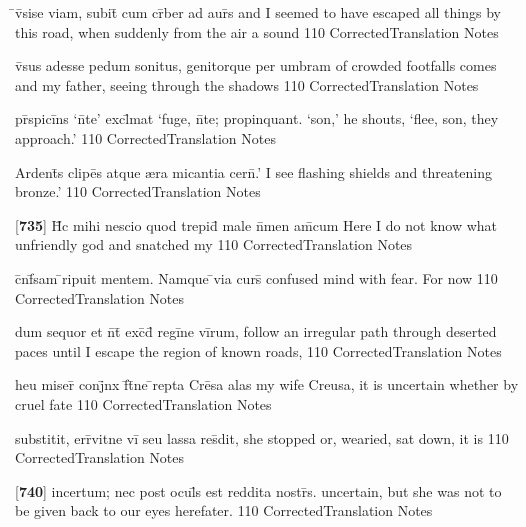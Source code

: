 \latline
  {\={}v\={}sise viam, subit\={} cum cr\={}ber ad aur\={\macron {\i}}s}
  { and I seemed to have escaped all things by this road, when suddenly from the air a sound }
  {110}
  { CorrectedTranslation }
  { Notes }


\latline
  {v\={\macron {\i}}sus adesse pedum sonitus, genitorque per umbram}
  { of crowded footfalls comes and my father, seeing through the shadows  }
  {110}
  { CorrectedTranslation }
  { Notes }


\latline
  {pr\={}spici\={}ns `n\={}te' excl\={}mat `fuge, n\={}te; propinquant.}
  { `son,' he shouts, `flee, son, they approach.' }
  {110}
  { CorrectedTranslation }
  { Notes }


\latline
  {Ardent\={\macron {\i}}s clipe\={}s atque {\ae}ra micantia cern\={}.'}
  { I see flashing shields and threatening bronze.' }
  {110}
  { CorrectedTranslation }
  { Notes }


\latline
  {[\textbf{735}] H\={\macron {\i}}c mihi nescio quod trepid\={} male n\={}men am\={\macron {\i}}cum}
  { Here I do not know what unfriendly god and snatched my  }
  {110}
  { CorrectedTranslation }
  { Notes }


\latline
  {c\={}nf\={}sam \={}ripuit mentem.  Namque \={}via curs\={}}
  { confused mind with fear.  For now  }
  {110}
  { CorrectedTranslation }
  { Notes }


\latline
  {dum sequor et n\={}t\={} exc\={}d\={} regi\={}ne vi\={}rum,}
  { follow an irregular path through deserted paces until I escape the region of known roads, }
  {110}
  { CorrectedTranslation }
  { Notes }


\latline
  {heu miser\={} conj\={}nx f\={}t\={}ne \={}repta Cre\={}sa}
  { alas my wife Creusa, it is uncertain whether by cruel fate  }
  {110}
  { CorrectedTranslation }
  { Notes }


\latline
  {substitit, err\={}vitne vi\={} seu lassa res\={}dit,}
  {she stopped or, wearied, sat down, it is  }
  {110}
  { CorrectedTranslation }
  { Notes }


\latline
  {[\textbf{740}] incertum; nec post ocul\={\macron {\i}}s est reddita nostr\={\macron {\i}}s.}
  { uncertain, but she was not to be given back to our eyes herefater. }
  {110}
  { CorrectedTranslation }
  { Notes }


